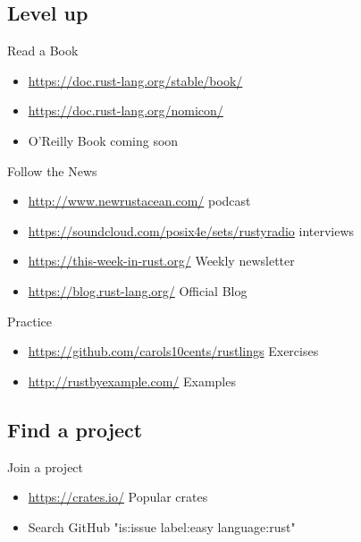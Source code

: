 \documentclass[xcolor={svgnames},hyperref]{beamer}
\begin{document}
\subsection{Level up}

    \begin{frame}
        Read a Book
        \begin{itemize}
            \item \url{https://doc.rust-lang.org/stable/book/}
            \item \url{https://doc.rust-lang.org/nomicon/}
            \item O'Reilly Book coming soon
        \end{itemize}
    \end{frame}

    \begin{frame}
        Follow the News
        \begin{itemize}
            \item \url{http://www.newrustacean.com/} podcast
            \item \url{https://soundcloud.com/posix4e/sets/rustyradio} interviews
            \item \url{https://this-week-in-rust.org/} Weekly newsletter
            \item \url{https://blog.rust-lang.org/} Official Blog
        \end{itemize}
    \end{frame}

    \begin{frame}
        Practice
        \begin{itemize}
            \item \url{https://github.com/carols10cents/rustlings} Exercises
            \item \url{http://rustbyexample.com/} Examples
        \end{itemize}
    \end{frame}

\subsection{Find a project}

    \begin{frame}
        Join a project
        \begin{itemize}
            \item \url{https://crates.io/} Popular crates
            \item Search GitHub "is:issue label:easy language:rust"
        \end{itemize}
    \end{frame}
\end{document}
